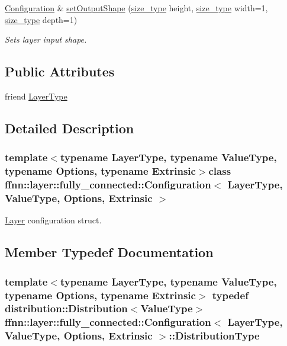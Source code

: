 \begin{DoxyCompactItemize}
\hyperlink{classffnn_1_1layer_1_1fully__connected_1_1_configuration}{Configuration} \& \hyperlink{classffnn_1_1layer_1_1fully__connected_1_1_configuration_a31ab2ef3372b7fd9fdefb88f437fc79a}{set\-Output\-Shape} (\hyperlink{namespaceffnn_a63b90a2fd70eb76684eac482a51633e5}{size\-\_\-type} height, \hyperlink{namespaceffnn_a63b90a2fd70eb76684eac482a51633e5}{size\-\_\-type} width=1, \hyperlink{namespaceffnn_a63b90a2fd70eb76684eac482a51633e5}{size\-\_\-type} depth=1)
\begin{DoxyCompactList}\small\item\em Sets layer input shape. \end{DoxyCompactList}\end{DoxyCompactItemize}
\subsection*{Public Attributes}
\begin{DoxyCompactItemize}
\item 
friend \hyperlink{classffnn_1_1layer_1_1fully__connected_1_1_configuration_a935cd081500398ecc6c5ed195dbc9402}{Layer\-Type}
\end{DoxyCompactItemize}


\subsection{Detailed Description}
\subsubsection*{template$<$typename Layer\-Type, typename Value\-Type, typename Options, typename Extrinsic$>$class ffnn\-::layer\-::fully\-\_\-connected\-::\-Configuration$<$ Layer\-Type, Value\-Type, Options, Extrinsic $>$}

\hyperlink{classffnn_1_1layer_1_1_layer}{Layer} configuration struct. 

\subsection{Member Typedef Documentation}
\hypertarget{classffnn_1_1layer_1_1fully__connected_1_1_configuration_a898b9f9b53bccc645867242b7fa163e9}{
\subsubsection[{Distribution\-Type}]{\setlength{\rightskip}{0pt plus 5cm}template$<$typename Layer\-Type, typename Value\-Type, typename Options, typename Extrinsic$>$ typedef {\bf distribution\-::\-Distribution}$<$Value\-Type$>$ {\bf ffnn\-::layer\-::fully\-\_\-connected\-::\-Configuration}$<$ {\bf Layer\-Type}, Value\-Type, Options, Extrinsic $>$\-::{\bf Distribution\-Type}}}\label{classffnn_1_1layer_1_1fully__connected_1_1_configuration_a898b9f9b53bccc645867242b7fa163e9}


